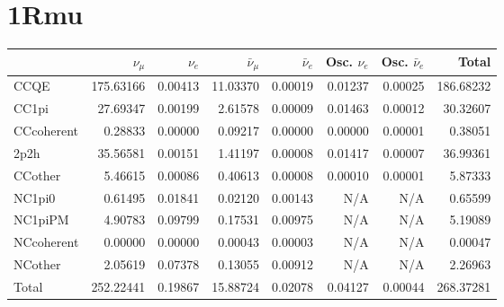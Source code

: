 \documentclass[10pt,a4paper]{article}
\begin{document}
\section*{1Rmu}
\begin{tabular} { | l ||r | r | r | r | r | r | | r | }
\hline
              & $\nu_\mu$            & $\nu_e$              & $\bar{\nu}_{\mu}$    & $\bar{\nu}_{e}$      & Osc. $\nu_e$         & Osc. $\bar{\nu}_{e}$ & Total                \\ \hline\hline
 CCQE         & 175.63166            & 0.00413              & 11.03370             & 0.00019              & 0.01237              & 0.00025              & 186.68232            \\ \hline
 CC1pi        & 27.69347             & 0.00199              & 2.61578              & 0.00009              & 0.01463              & 0.00012              & 30.32607             \\ \hline
 CCcoherent   & 0.28833              & 0.00000              & 0.09217              & 0.00000              & 0.00000              & 0.00001              & 0.38051              \\ \hline
 2p2h         & 35.56581             & 0.00151              & 1.41197              & 0.00008              & 0.01417              & 0.00007              & 36.99361             \\ \hline
 CCother      & 5.46615              & 0.00086              & 0.40613              & 0.00008              & 0.00010              & 0.00001              & 5.87333              \\ \hline
 NC1pi0       & 0.61495              & 0.01841              & 0.02120              & 0.00143              & N/A                  & N/A                  & 0.65599              \\ \hline
 NC1piPM      & 4.90783              & 0.09799              & 0.17531              & 0.00975              & N/A                  & N/A                  & 5.19089              \\ \hline
 NCcoherent   & 0.00000              & 0.00000              & 0.00043              & 0.00003              & N/A                  & N/A                  & 0.00047              \\ \hline
 NCother      & 2.05619              & 0.07378              & 0.13055              & 0.00912              & N/A                  & N/A                  & 2.26963              \\ \hline
\hline
 Total        & 252.22441            & 0.19867              & 15.88724             & 0.02078              & 0.04127              & 0.00044              & 268.37281            \\ \hline

\end{tabular}
\end{document}
